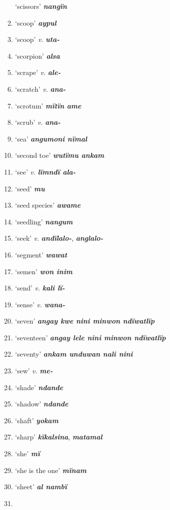 \begin{enumerate}[noitemsep, label={}, align=left, widest=190, labelsep=1ex,leftmargin=*,itemindent=-10pt]
‘scissors’ \textbf{\textit{nangïn}} \item
‘scoop’ \textbf{\textit{aypul}} \item
‘scoop’ \textit{v.} \textbf{\textit{uta-}} \item
‘scorpion’ \textbf{\textit{alsa}} \item
‘scrape’ \textit{v.} \textbf{\textit{ale-}} \item
‘scratch’ \textit{v.} \textbf{\textit{ana-}} \item
‘scrotum’ \textbf{\textit{mïtïn ame}} \item
‘scrub’ \textit{v.} \textbf{\textit{ana-}} \item
‘sea’ \textbf{\textit{angumoni nïmal}} \item
‘second toe’ \textbf{\textit{wutïmu ankam}} \item
‘see’ \textit{v.} \textbf{\textit{lïmndï ala-}} \item
‘seed’ \textbf{\textit{mu}} \item
‘seed species’ \textbf{\textit{awame}} \item
‘seedling’ \textbf{\textit{nangum}} \item
‘seek’ \textit{v.} \textbf{\textit{andïlalo-}}, \textbf{\textit{anglalo-}} \item
‘segment’ \textbf{\textit{wawat}} \item
‘semen’ \textbf{\textit{won inim}} \item
‘send’ \textit{v.} \textbf{\textit{kali lï-}} \item
‘sense’ \textit{v.} \textbf{\textit{wana-}} \item
‘seven’ \textbf{\textit{angay kwe nini minwon ndïwatlïp}} \item
‘seventeen’ \textbf{\textit{angay lele nini minwon ndïwatlïp}} \item
‘seventy’ \textbf{\textit{ankam unduwan nali nini}} \item
‘sew’ \textit{v.} \textbf{\textit{me-}} \item
‘shade’ \textbf{\textit{ndande}} \item
‘shadow’ \textbf{\textit{ndande}} \item
‘shaft’ \textbf{\textit{yokam}} \item
‘sharp’ \textbf{\textit{kïkalsina}}, \textbf{\textit{matamal}} \item
‘she’ \textbf{\textit{mï}} \item
‘she is the one’ \textbf{\textit{mïnam}} \item
‘sheet’ \textbf{\textit{al nambï}} \item

\end{enumerate}
